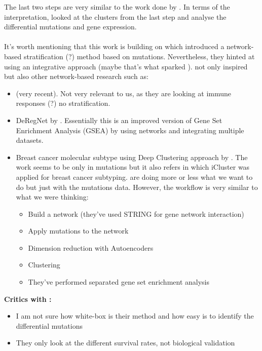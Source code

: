 The last two steps are very similar to the work done by \citet{Robertson2017-mg}. In terms of the interpretation, \citet{He2017-dj} looked at the clusters from the last step and analyse the differential mutations and gene expression.
\\~\\
It's worth mentioning that this work is building on \citet{Hofree2013-ld} which introduced a network-based stratification (?) method based on mutations. Nevertheless, they hinted at using an integrative approach (maybe that's what sparked \citet{He2017-dj}). \citet{Hofree2013-ld} not only inspired \citet{He2017-dj} but also other network-based research such as:
\begin{itemize}
    \item \citet{Kong2022-gv} (very recent). Not very relevant to us, as they are looking at immune responses (?) no stratification.
     \item DeRegNet by \citet{Winkler2022-vg}. Essentially this is an improved version of Gene Set Enrichment Analysis (GSEA) by using networks and integrating multiple datasets.
     \item Breast cancer molecular subtype using Deep Clustering approach by \citet{Rohani2020-px}. The work seems to be only in mutations but it also refers \citet{Curtis2012-ff} in which iCluster was applied for breast cancer subtyping. \citet{Rohani2020-px} are doing more or less what we want to do but just with the mutations data. However, the workflow is very similar to what we were thinking:
     \begin{itemize}
         \item Build a network (they've used STRING for gene network interaction)
         \item Apply mutations to the network
         \item Dimension reduction with Autoencoders
         \item Clustering
         \item They've performed separated gene set enrichment analysis
     \end{itemize}
\end{itemize}

\textbf{Critics with \citet{He2017-dj}:}
\begin{itemize}
    \item I am not sure how white-box is their method and how easy is to identify the differential mutations
    \item They only look at the different survival rates, not biological validation
\end{itemize}

